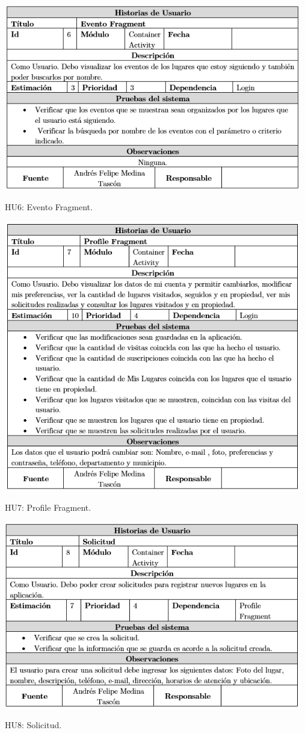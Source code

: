 \documentclass[12pt,letterpaper,openany]{book}
\begin{document}
\begin{table}[H]
\centering
\includegraphics[width=13cm]{./imagenes/HU/HU6}
\caption{HU6: Evento Fragment.}
\end{table}

\begin{table}[H]
\centering
\includegraphics[width=13cm]{./imagenes/HU/HU7}
\caption{HU7: Profile Fragment.}
\end{table}

\begin{table}[H]
\centering
\includegraphics[width=13cm]{./imagenes/HU/HU8}
\caption{HU8: Solicitud.}
\end{table}
\end{document}
